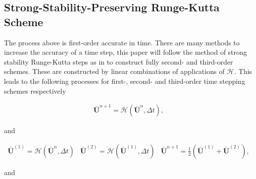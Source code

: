 \documentclass[SingleSpace,12pt]{Serre_ASCE}
\begin{document}
\subsection{Strong-Stability-Preserving Runge-Kutta Scheme} %
The process above is first-order accurate in time. There are many methods to increase the accuracy of a time step, this paper will follow the method of strong stability Runge-Kutta steps as in  to construct fully second- and third-order schemes. These are constructed by linear combinations of applications of $\mathcal{H}$. This leads to the following processes for first-, second- and third-order time stepping schemes respectively
\begin{linenomath*}
\begin{gather}\label{eq:SSPRK1}
\boldsymbol{\bar{U}}^{n+1} = \mathcal{H}\left(\boldsymbol{\bar{U}}^{n},\Delta t\right),
\end{gather}
\end{linenomath*}
and
\begin{linenomath*}
\begin{subequations}
\begin{gather}\label{eq:SSPRK21}
\boldsymbol{\bar{U}}^{\left(1\right)} = \mathcal{H}\left(\boldsymbol{\bar{U}}^{n},\Delta t\right)
\end{gather}
\begin{gather}\label{eq:SSPRK22}
\boldsymbol{\bar{U}}^{\left(2\right)} = \mathcal{H}\left(\boldsymbol{\bar{U}}^{\left(1\right)},\Delta t\right)
\end{gather}
\begin{gather}\label{eq:SSPRK23}
\boldsymbol{\bar{U}}^{n+1} = \frac{1}{2}\left(\boldsymbol{\bar{U}}^{\left(1\right)} + \boldsymbol{\bar{U}}^{\left(2\right)}  \right),
\end{gather}
\end{subequations}
\label{eq:SSPRK2}
\end{linenomath*}
and
\end{document}
